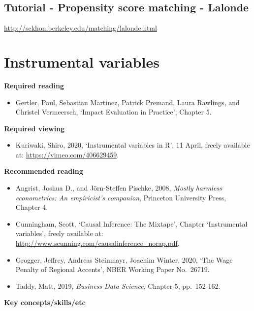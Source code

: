 \documentclass[
]{book}
\providecommand{\tightlist}{%
  \setlength{\itemsep}{0pt}\setlength{\parskip}{0pt}}
\begin{document}
\hypertarget{tutorial---propensity-score-matching---lalonde}{%
\section{Tutorial - Propensity score matching - Lalonde}\label{tutorial---propensity-score-matching---lalonde}}

\url{http://sekhon.berkeley.edu/matching/lalonde.html}

\hypertarget{instrumental-variables}{%
\chapter{Instrumental variables}\label{instrumental-variables}}

\textbf{Required reading}

\begin{itemize}
\tightlist
\item
  Gertler, Paul, Sebastian Martinez, Patrick Premand, Laura Rawlings, and Christel Vermeersch, `Impact Evaluation in Practice', Chapter 5.
\end{itemize}

\textbf{Required viewing}

\begin{itemize}
\tightlist
\item
  Kuriwaki, Shiro, 2020, `Instrumental variables in R', 11 April, freely available at: \url{https://vimeo.com/406629459}.
\end{itemize}

\textbf{Recommended reading}

\begin{itemize}
\tightlist
\item
  Angrist, Joshua D., and Jörn-Steffen Pischke, 2008, \emph{Mostly harmless econometrics: An empiricist's companion}, Princeton University Press, Chapter 4.
\item
  Cunningham, Scott, `Causal Inference: The Mixtape', Chapter `Instrumental variables', freely available at: \url{http://www.scunning.com/causalinference_norap.pdf}.
\item
  Grogger, Jeffrey, Andreas Steinmayr, Joachim Winter, 2020, `The Wage Penalty of Regional Accents', NBER Working Paper No.~26719.
\item
  Taddy, Matt, 2019, \emph{Business Data Science}, Chapter 5, pp.~152-162.
\end{itemize}

\textbf{Key concepts/skills/etc}
\end{document}
